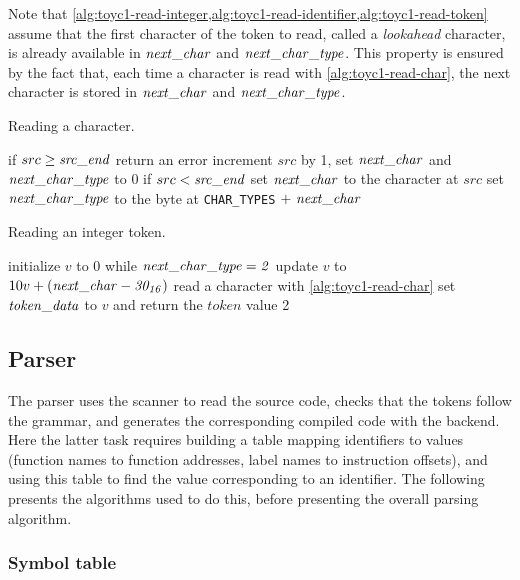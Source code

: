 Note that
\cref{alg:toyc1-read-integer,alg:toyc1-read-identifier,alg:toyc1-read-token}
assume that the first character of the token to read, called a {\em lookahead}
character, is already available in $\it{next\_char}$ and
$\it{next\_char\_type}$. This property is ensured by the fact that, each time a
character is read with \cref{alg:toyc1-read-char}, the next character is stored
in $\it{next\_char}$ and $\it{next\_char\_type}$.

\begin{Algorithm}
\caption{Reading a character.}\label{alg:toyc1-read-char}
\begin{algorithmic}[1]
\State if $src \ge \it{src\_end}$ return an error
\State increment $src$ by 1, set $\it{next\_char}$ and $\it{next\_char\_type}$
to 0
\Begin if $src < \it{src\_end}$
  \State set $\it{next\_char}$ to the character at $src$
  \State set $\it{next\_char\_type}$ to the byte at {\tt CHAR\_TYPES}
  $+\ \it{next\_char}$
\End
\end{algorithmic}
\end{Algorithm}

\begin{Algorithm}
\caption{Reading an integer token.}\label{alg:toyc1-read-integer}
\begin{algorithmic}[1]
\State initialize $v$ to 0
\Begin while $\it{next\_char\_type}=2$
  \State update $v$ to $10v+(\it{next\_char}-30_{16})$
  \State read a character with \cref{alg:toyc1-read-char}
\End
\State set $\it{token\_data}$ to $v$ and return the $token$ value 2
\end{algorithmic}
\end{Algorithm}

\subsection{Parser}

The parser uses the scanner to read the source code, checks that the tokens
follow the grammar, and generates the corresponding compiled code with the
backend. Here the latter task requires building a table mapping identifiers to
values (function names to function addresses, label names to instruction
offsets), and using this table to find the value corresponding to an identifier.
The following presents the algorithms used to do this, before presenting the
overall parsing algorithm.

\subsubsection{Symbol table}

